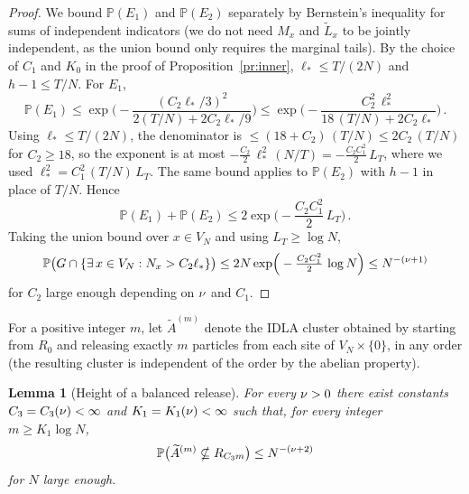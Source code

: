 \documentclass[11pt,a4paper,reqno]{amsart}
\newtheorem{Lemma}[Theorem]{Lemma}
\theoremstyle{definition}
\newcommand{\bbP}{{\ensuremath{\mathbb P}} }
\begin{document}
\begin{proof}
We bound $\bbP(E_1)$ and $\bbP(E_2)$ separately by Bernstein's inequality for sums of independent indicators (we do not need $M_x$ and $\widetilde L_x$ to be jointly independent, as the union bound only requires the marginal tails). By the choice of $C_1$ and $K_0$ in the proof of Proposition~\ref{pr:inner}, $\ell_* \leq T/(2N)$ and $h - 1 \leq T/N$. For $E_1$,
\[
  \bbP(E_1) \leq \exp\!\Big( -\frac{(C_2 \ell_*/3)^2}{2 (T/N) + 2 C_2 \ell_*/9} \Big)
  \leq \exp\!\Big( -\frac{C_2^2\,\ell_*^2}{18\, (T/N) + 2 C_2 \ell_*} \Big)\,.
\]
Using $\ell_* \leq T/(2N)$, the denominator is $\leq (18 + C_2)\,(T/N) \leq 2 C_2\, (T/N)$ for $C_2 \geq 18$, so the exponent is at most $-\frac{C_2}{2}\,\ell_*^2\,(N/T) = -\frac{C_2 C_1^2}{2}\,L_T$, where we used $\ell_*^2 = C_1^2\,(T/N)\, L_T$. The same bound applies to $\bbP(E_2)$ with $h-1$ in place of $T/N$. Hence
\[
  \bbP(E_1) + \bbP(E_2) \leq 2 \exp\!\Big( -\frac{C_2 C_1^2}{2}\,L_T \Big)\,.
\]
Taking the union bound over $x \in V_N$ and using $L_T \geq \log N$,
\[
  \bbP\big( G \cap \{\exists\, x \in V_N : N_x > C_2 \ell_*\} \big)
  \leq 2 N \exp\!\Big( -\tfrac{C_2 C_1^2}{2}\,\log N \Big) \leq N^{-(\n+1)}
\]
for $C_2$ large enough depending on $\nu$ and $C_1$.
\end{proof}

For a positive integer $m$, let $\widetilde A^{(m)}$ denote the IDLA cluster obtained by starting from $R_0$ and releasing exactly $m$ particles from each site of $V_N \times \{0\}$, in any order (the resulting cluster is independent of the order by the abelian property).

\begin{Lemma}[Height of a balanced release]\label{le:released}
For every $\nu > 0$ there exist constants $C_3 = C_3(\nu) < \infty$ and $K_1 = K_1(\nu) < \infty$ such that, for every integer $m \geq K_1 \log N$,
	\[ \bbP\big( \widetilde A^{(m)} \nsubseteq R_{C_3 m} \big) \leq N^{-(\n+2)} \]
for $N$ large enough.
\end{Lemma}
\end{document}
